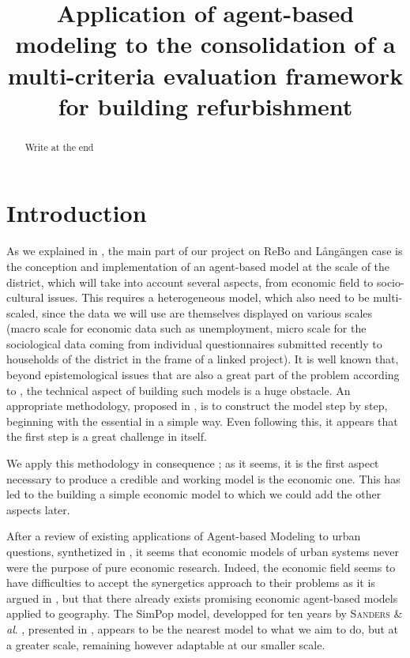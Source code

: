\documentclass[english]{article}
\newcommand{\noun}[1]{\textsc{#1}}
\begin{document}
\title{Application of agent-based modeling to the consolidation of a multi-criteria
evaluation framework for building refurbishment}
\maketitle
\begin{abstract}
Write at the end
\end{abstract}

\section*{Introduction}

As we explained in \cite{RaimbaultReBoDescription0412}, the main
part of our project on ReBo and L{\aa}ngängen case is the conception
and implementation of an agent-based model at the scale of the district,
which will take into account several aspects, from economic field
to socio-cultural issues. This requires a heterogeneous model, which
also need to be multi-scaled, since the data we will use
are themselves displayed on various scales (macro scale for economic data
such as unemployment, micro scale for the sociological data coming
from individual questionnaires submitted recently to households of
the district in the frame of a linked project). It is well known that,
beyond epistemological issues that are also a great part of the problem
according to \cite{michel2004formalisme}, the technical aspect of
building such models is a huge obstacle. An appropriate methodology,
proposed in \cite{Duboz:phd}, is to construct the model step by step,
beginning with the essential in a simple way. Even following this,
it appears that the first step is a great challenge in itself.

We apply this methodology in consequence ; as it seems, it is the
first aspect necessary to produce a credible and working model
is the economic one. This has led to the building a simple economic model
to which we could add the other aspects later.

After a review of existing applications of Agent-based Modeling to
urban questions, synthetized in \cite{ABMReview07,ABMPers12} , it seems that
economic models of urban systems never were the purpose of
pure economic research. Indeed, the economic field seems to have difficulties
to accept the synergetics approach to their problems as it is argued
in \cite{farmer2009economy}, but that there already exists promising
economic agent-based models applied to geography. The SimPop model,
developped for ten years by \noun{Sanders} \& \textit{al}. , presented
in \cite{sanders1997simpop}, appears to be the nearest model to what we
aim to do, but at a greater scale, remaining however adaptable at
our smaller scale.
\end{document}
